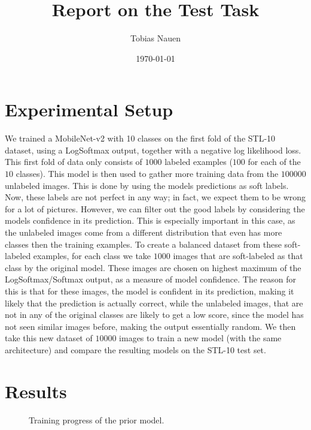 \documentclass[a4paper,onecolumn,oneside,11pt,english,bibliography=totoc]{article}
\title{Report on the Test Task}
\author{
	Tobias Nauen
}
\date{\today}
\newcommand{\1}{\mathds{1}}
\theoremstyle{breakit}
\theoremstyle{break}
\begin{document}
	\maketitle
	\section*{Experimental Setup}
	We trained a MobileNet-v2 with 10 classes on the first fold of the STL-10 dataset, using a LogSoftmax output, together with a negative log likelihood loss. This first fold of data only consists of $1000$ labeled examples ($100$ for each of the $10$ classes). This model is then used to gather more training data from the $100 000$ unlabeled images. This is done by using the models predictions as soft labels. Now, these labels are not perfect in any way; in fact, we expect them to be wrong for a lot of pictures. However, we can filter out the good labels by considering the models confidence in its prediction. This is especially important in this case, as the unlabeled images come from a different distribution that even has more classes then the training examples. To create a balanced dataset from these soft-labeled examples, for each class we take $1000$ images that are soft-labeled as that class by the original model. These images are chosen on highest maximum of the LogSoftmax/Softmax output, as a measure of model confidence. The reason for this is that for these images, the model is confident in its prediction, making it likely that the prediction is actually correct, while the unlabeled images, that are not in any of the original classes are likely to get a low score, since the model has not seen similar images before, making the output essentially random. We then take this new dataset of $10000$ images to train a new model (with the same architecture) and compare the resulting models on the STL-10 test set.
	
	\section*{Results}
	\begin{figure}[h]
	    \centering
	    \resizebox{\textwidth}{!}{}
	    \caption{Training progress of the prior model.}
	    \label{fig:training_prior}
	\end{figure}
	
	\begin{table}[h]
	    \centering
	    \caption{Stats of the soft-labeled dataset of $10000$ images.}
	    \label{tab:soft_dataset_stats}
	\end{table}
	
\end{document}
